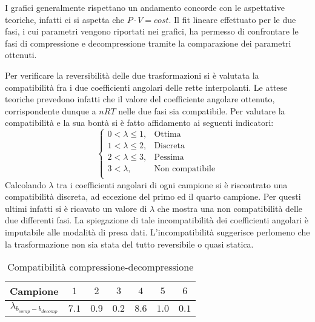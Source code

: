 \documentclass[a4paper,11pt,oneside]{article}
\begin{document}
I grafici generalmente rispettano un andamento concorde con le aspettative teoriche, infatti ci si aspetta che $P\cdot V = cost$. Il fit lineare effettuato per le due fasi, i cui parametri vengono riportati nei grafici, ha permesso di confrontare le fasi di compressione e decompressione tramite la comparazione dei parametri ottenuti.

Per verificare la reversibilità delle due trasformazioni si è valutata la compatibilità fra i due coefficienti angolari delle rette interpolanti. Le attese teoriche prevedono infatti che il valore del coefficiente angolare ottenuto, corrispondente dunque a $n R T$ nelle due fasi sia compatibile. Per valutare la compatibilità e la sua bontà si è fatto affidamento ai seguenti indicatori:
\begin{equation*}%
    \label{eq:cases}
    \begin{cases}
    0<\lambda\leq 1, & \text{Ottima}\\
    1<\lambda\leq2, & \text{Discreta}\\
    2<\lambda\leq3, & \text{Pessima}\\
    3<\lambda, & \text{Non compatibile}\\
    \end{cases}
\end{equation*}
Calcolando $\lambda$ tra i coefficienti angolari di ogni campione si è riscontrato una compatibilità discreta, ad eccezione del primo ed il quarto campione. Per questi ultimi infatti si è ricavato un valore di $\lambda$ che mostra una non compatibilità delle due differenti fasi. La spiegazione di tale incompatibilità dei coefficienti angolari è imputabile alle modalità di presa dati. L'incompatibilità suggerisce perlomeno che la trasformazione non sia stata del tutto reversibile o quasi statica. 

\begin{table}[h!]
\centering
\begin{tabular}{|c|c|c|c|c|c|c|}
    \hline
    \textbf{Campione} & $1$ & $2$ & $3$ & $4$ & $5$ & $6$ \\ \hline
    \rowcolor[rgb]{0.85,0.85,0.85}$\lambda_{b_{comp}-b_{decomp}}$ & $7.1$ & $0.9$ & $0.2$ & $8.6$ & $1.0$ & $0.1$ \\ \hline
    \end{tabular}
\caption{Compatibilità compressione-decompressione}
\label{tab:compatibilita_coeff_ang_compress_decompress}
\end{table}
\end{document}
